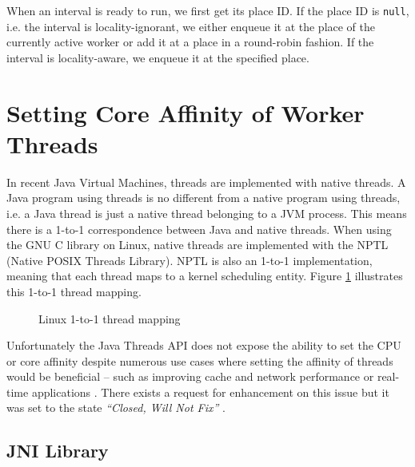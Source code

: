 When an interval is ready to run, we first get its place ID. If the
place ID is \lstinline!null!, i.e. the interval is locality-ignorant,
we either enqueue it at the place of the currently active worker or
add it at a place in a round-robin fashion. If the interval is
locality-aware, we enqueue it at the specified place.


\section{Setting Core Affinity of Worker Threads}
\label{sec:locality-implementation-core-affinity}

In recent Java Virtual Machines, threads are implemented with native
threads. A Java program using threads is no different from a native
program using threads, i.e. a Java thread is just a native thread
belonging to a JVM process. This means there is a 1-to-1
correspondence between Java and native threads. When using the GNU C
library on Linux, native threads are implemented with the NPTL (Native
POSIX Threads Library). NPTL is also an 1-to-1 implementation, meaning
that each thread maps to a kernel scheduling entity. Figure
\ref{fig:locality-implementation-core-affinity-thread-mapping}
illustrates this 1-to-1 thread mapping.

\begin{figure}[htb]
  \centering
  \caption{Linux 1-to-1 thread mapping}
  \label{fig:locality-implementation-core-affinity-thread-mapping}
\end{figure}

Unfortunately the Java Threads API does not expose the ability to set
the CPU or core affinity despite numerous use cases where setting the
affinity of threads would be beneficial -- such as improving cache and
network performance or real-time applications \cite{Love2003, Dow2005,
  Foong2008}. There exists a request for enhancement on this issue but
it was set to the state \emph{``Closed, Will Not Fix''}
\cite{Oracle1999}.

\subsection{JNI Library}
\label{sec:locality-implementation-core-affinity-jni-library}

